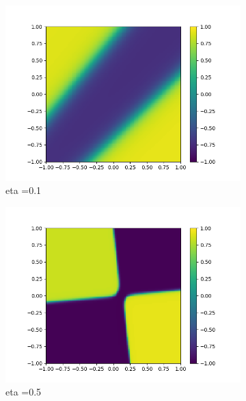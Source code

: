 \begin{figure}[h!]
  \centering
  \begin{subfigure}[b]{.3\linewidth}
    \includegraphics[width=\linewidth]{fig/xor2221_eta01.png}
    \caption{eta =0.1}
  \end{subfigure}
  \quad
  \begin{subfigure}[b]{.3\linewidth}
    \includegraphics[width=\linewidth]{fig/xor2221_eta05.png}
    \caption{eta =0.5}
  \end{subfigure}
  \quad
  \begin{subfigure}[b]{.3\linewidth}

\end{subfigure}
\end{figure}
